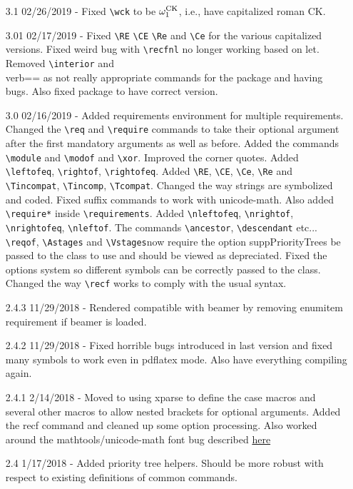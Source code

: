 \documentclass[leqno,11pt]{amsart}
\begin{document}
\begin{itemize}
	\item[3.1]  02/26/2019 - Fixed \verb=\wck= to be \( \omega^{\mathrm{CK}}_1 \), i.e., have capitalized roman CK.
	\item[3.01] 02/17/2019 - Fixed \verb=\RE= \verb=\CE= \verb=\Re= and \verb=\Ce= for the various capitalized versions.  Fixed weird bug with \verb=\recfnl= no longer working based on let.  Removed \verb=\interior= and \\verb=\closure= as not really appropriate commands for the package and having bugs.  Also fixed package to have correct version.
	\item[3.0] 02/16/2019 - Added requirements environment for multiple requirements.  Changed the \verb=\req= and \verb=\require= commands to take their optional argument after the first mandatory arguments as well as before.  Added the commands \verb=\module= and \verb=\modof= and \verb=\xor=.  Improved the corner quotes. Added \verb=\leftofeq=, \verb=\rightof=, \verb=\rightofeq=.  Added \verb=\RE=, \verb=\CE=, \verb=\Ce=, \verb=\Re= and  \verb=\Tincompat=, \verb=\Tincomp=, \verb=\Tcompat=.  Changed the way strings are symbolized and coded.  Fixed suffix commands to work with unicode-math.  Also added \verb=\require*= inside \verb=\requirements=. Added \verb=\nleftofeq=, \verb=\nrightof=, \verb=\nrightofeq=, \verb=\nleftof=.  The commands \verb=\ancestor=, \verb=\descendant= etc... \verb=\reqof=, \verb=\Astages= and \verb=\Vstages=now require the option suppPriorityTrees be passed to the class to use and should be viewed as depreciated.  Fixed the options system so different symbols can be correctly passed to the class.    Changed the way \verb=\recf= works to comply with the usual syntax.
	\item[2.4.3] 11/29/2018 - Rendered compatible with beamer by removing enumitem requirement if beamer is loaded.
	\item[2.4.2] 11/29/2018 - Fixed horrible bugs introduced in last version and fixed many symbols to work even in pdflatex mode.  Also have everything compiling again.
	\item[2.4.1] 2/14/2018 - Moved to using xparse to define the case macros and several other macros to allow nested brackets for optional arguments.  Added the recf command and cleaned up some option processing.  Also worked around the mathtools/unicode-math font bug described \href{https://tex.stackexchange.com/questions/335164/incompatibility-with-mathtools-and-unicode-math-in-xelatex/335177}{here}
	\item[2.4] 1/17/2018 - Added priority tree helpers.  Should be more robust with respect to existing definitions of common commands.

\end{itemize}
\end{document}

